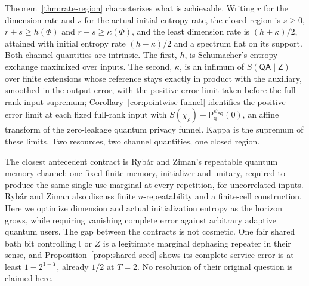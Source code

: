 \documentclass[11pt,a4paper]{article}
\numberwithin{equation}{section}
\theoremstyle{plain}
\theoremstyle{definition}
\newcommand{\rg}[1]{\mathsf{#1}}
\newcommand{\one}{\mathbb{I}}
\newcommand{\Pfun}{\mathsf{P}_{\mathrm{q}}}%
\begin{document}
Theorem~\ref{thm:rate-region} characterizes what is achievable. Writing $r$
for the dimension rate and $s$ for the actual initial entropy rate, the closed
region is $s\ge 0$, $r+s\ge h(\Phi)$ and $r-s\ge\kappa(\Phi)$, and the least
dimension rate is $(h+\kappa)/2$, attained with initial entropy rate
$(h-\kappa)/2$ and a spectrum flat on its support. Both channel quantities are
intrinsic. The first, $h$, is Schumacher's entropy exchange maximized over
inputs. The second, $\kappa$, is an infimum of $S(\rg{Q}\rg{A}\mid\rg{Z})$
over finite extensions whose reference stays exactly in product with the
auxiliary, smoothed in the output error, with the positive-error limit taken
before the full-rank input supremum; Corollary~\ref{cor:pointwise-funnel}
identifies the positive-error limit at each fixed full-rank input with
$S(\chi_\rho)-\Pfun^{\psi_{\rg{E}\rg{Q}}}(0)$, an affine transform of the
zero-leakage quantum privacy funnel. Kappa is the supremum of these limits.
Two resources, two channel quantities, one closed region.

The closest antecedent contract is Ryb\'ar and Ziman's repeatable quantum
memory channel: one fixed finite memory, initializer and unitary, required to
produce the same single-use marginal at every repetition, for uncorrelated
inputs. Ryb\'ar and Ziman also discuss finite $n$-repeatability and a finite-cell
construction. Here we optimize dimension and actual initialization entropy
as the horizon grows, while requiring vanishing complete error against
arbitrary adaptive quantum users. The gap between the contracts is not cosmetic. One fair shared bath
bit controlling $\one$ or $Z$ is a legitimate marginal dephasing repeater in
their sense, and Proposition~\ref{prop:shared-seed} shows its complete service
error is at least $1-2^{1-T}$, already $1/2$ at $T=2$. No resolution of their
original question is claimed here.
\end{document}
